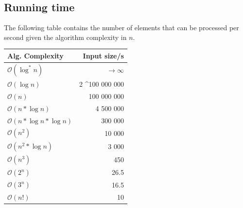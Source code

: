 \documentclass[8pt,a4paper,landscape,oneside]{amsart}
\newcommand{\bigO}{\mathcal{O}}
\begin{document}
\begin{multicols*}{3}
        
\section{Running time}
The following table contains the number of elements that can be processed per second given the algorithm complexity in $n$.
\begin{center}
\begin{tabular}{lr}
Alg. Complexity & Input size/s \\ \hline
$\bigO(\log^*{n})$   & $\rightarrow \infty$ \\
$\bigO(\log{n})$     & 2 \textasciicircum 100 000 000 \\
$\bigO(n)$           & 100 000 000 \\
$\bigO(n*\log{n})$   & 4 500 000 \\
$\bigO(n*\log{n}*\log{n})$ & 300 000 \\
$\bigO(n^2)$         & 10 000 \\
$\bigO(n^2*\log{n})$ & 3 000 \\
$\bigO(n^3)$         & 450 \\
$\bigO(2^n)$         & 26.5 \\
$\bigO(3^n)$         & 16.5 \\
$\bigO(n!)$          & 10
\end{tabular}
\end{center}



\end{multicols*}
\end{document}
